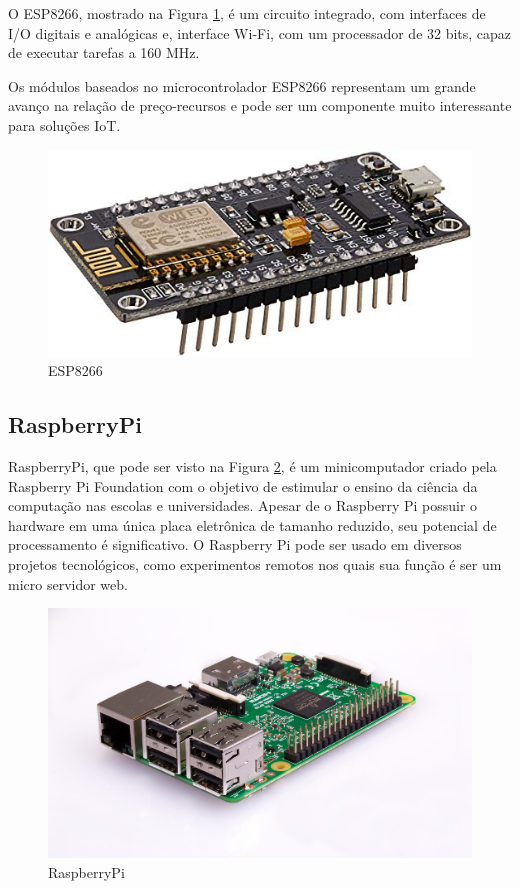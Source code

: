O ESP8266, mostrado na Figura \ref{fig:esp}, é um circuito integrado, com interfaces de I/O digitais e analógicas e, interface Wi-Fi, com um processador de 32 bits, capaz de executar tarefas a 160 MHz.

Os módulos baseados no microcontrolador ESP8266 representam um grande avanço na relação de preço-recursos e pode ser um componente muito interessante para soluções IoT.\cite {de2017internet}

\begin{figure}[htbp]
		\centering
		\includegraphics[scale=0.5]{figuras/esp8266_.jpg}
		\caption{ESP8266}
		\label{fig:esp}
\end{figure}


\subsection{RaspberryPi}

RaspberryPi, que pode ser visto na Figura \ref{fig:rpi}, é um minicomputador criado pela Raspberry Pi Foundation com o objetivo de estimular o ensino da ciência da computação nas escolas e universidades. Apesar de o Raspberry Pi possuir o hardware em uma única placa eletrônica de tamanho reduzido, seu potencial de processamento é significativo. O Raspberry Pi pode ser usado em diversos projetos tecnológicos, como experimentos remotos nos quais sua função é ser um micro servidor web.\cite{crotti2013raspberrypi}

\begin{figure}[htbp]
		\centering
		\includegraphics[scale=0.2]{figuras/raspberrypi.jpg}
		\caption{RaspberryPi}
		\label{fig:rpi}
\end{figure}


